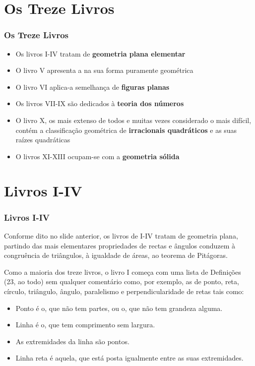 \section{Os Treze Livros}
\begin{frame}
    \frametitle{Os Treze Livros}
    \begin{itemize}
        \item Os livros I-IV tratam de \textbf{geometria plana elementar}
        \item O livro V apresenta a  na sua forma puramente geométrica
        \item O livro VI aplica-a semelhança de \textbf{figuras planas}
        \item Os livros VII-IX são dedicados à \textbf{teoria dos números}
        \item O livro X, os mais extenso de todos e muitas vezes considerado o mais difícil, contém a classificação geométrica de \textbf{irracionais quadráticos} e as suas raízes quadráticas
        \item O livros XI-XIII ocupam-se com a \textbf{geometria sólida}
    \end{itemize}
\end{frame}

\section{Livros I-IV}
\begin{frame}
    \frametitle{Livros I-IV}
    \justifying
    Conforme dito no slide anterior, os livros de I-IV tratam de geometria plana, partindo das mais elementares propriedades de rectas e ângulos conduzem à congruência de triângulos, à igualdade de áreas, ao teorema de Pitágoras.
    \vspace{3mm}
    
    Como a maioria dos treze livros, o livro I começa com uma lista de Definições (23, ao todo) sem qualquer comentário como, por exemplo, as de ponto, reta, círculo, triângulo, ângulo, paralelismo e perpendicularidade de retas tais como:
    \vspace{3mm}
    \begin{itemize}
        \item Ponto é o, que não tem partes, ou o, que não tem grandeza alguma.
        \item Linha é o, que tem comprimento sem largura.
        \item As extremidades da linha são pontos.
        \item Linha reta é aquela, que está posta igualmente entre as suas extremidades.
    \end{itemize}
\end{frame}

